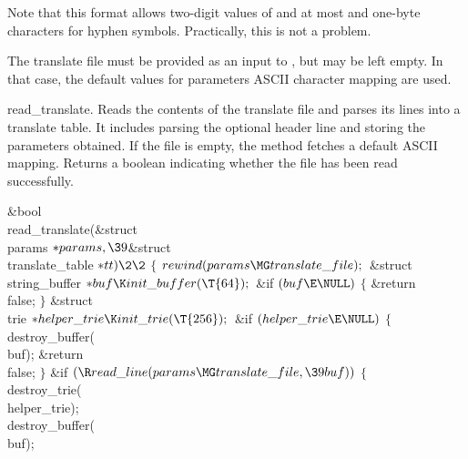 Note that this format allows two-digit values of \lefthyphenminpar{} and %
\righthyphenminpar{} at most and one-byte
characters for hyphen symbols. Practically, this is not a problem.

The translate file must be provided as an input to \utfpatgen, but may be left
empty. In that case, the default values
for parameters ASCII character mapping are used.

\fi

read\_translate.
Reads the contents of the translate file and parses its lines into a translate
table. It includes parsing the optional
header line and storing the parameters obtained. If the file is empty, the
method fetches a default ASCII mapping.
Returns a boolean indicating whether the file has been read successfully.

\Y\B\1\1\&{bool} \\{read\_translate}(\&{struct} \\{params} ${}{*}\\{params},%
\39{}$\&{struct} \\{translate\_table} ${}{*}\\{tt})\2\2{}$\6
${}\{{}$\1\6
${}\\{rewind}(\\{params}\MG\\{translate\_file});{}$\7
\&{struct} \\{string\_buffer} ${}{*}\\{buf}\K\\{init\_buffer}(\T{64});{}$\7
\&{if} ${}(\\{buf}\E\NULL){}$\5
${}\{{}$\1\6
\&{return} \\{false};\6
\4${}\}{}$\2\7
\&{struct} \\{trie} ${}{*}\\{helper\_trie}\K\\{init\_trie}(\T{256});{}$\7
\&{if} ${}(\\{helper\_trie}\E\NULL){}$\5
${}\{{}$\1\6
\\{destroy\_buffer}(\\{buf});\6
\&{return} \\{false};\6
\4${}\}{}$\2\6
\&{if} ${}(\R\\{read\_line}(\\{params}\MG\\{translate\_file},\39\\{buf})){}$\5
${}\{{}$\1\6
\\{destroy\_trie}(\\{helper\_trie});\6
\\{destroy\_buffer}(\\{buf});\6
